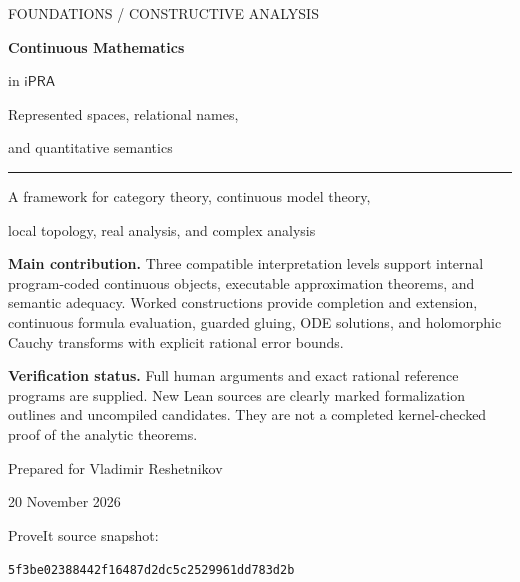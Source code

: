 \documentclass[11pt,a4paper]{article}
\newcommand{\ipra}{\ensuremath{\mathsf{iPRA}}}
\theoremstyle{definition}
\theoremstyle{remark}
\begin{document}
\begin{titlepage}
\color{ink}
\vspace*{12mm}
{\large FOUNDATIONS \; / \; CONSTRUCTIVE ANALYSIS}\par
\vspace{16mm}
{\fontsize{32}{37}\selectfont\bfseries Continuous Mathematics\par in \ipra}\par
\vspace{10mm}
{\Large Represented spaces, relational names,\par and quantitative semantics}\par
\vspace{14mm}
\rule{\linewidth}{1.2pt}\par
\vspace{7mm}
{\large A framework for category theory, continuous model theory,\par
local topology, real analysis, and complex analysis}\par
\vfill
\begin{minipage}{.94\linewidth}
\color{black}
\textbf{Main contribution.} Three compatible interpretation levels support
internal program-coded continuous objects, executable approximation theorems,
and semantic adequacy. Worked constructions provide completion and extension,
continuous formula evaluation, guarded gluing, ODE solutions, and holomorphic
Cauchy transforms with explicit rational error bounds.

\medskip
\textbf{Verification status.} Full human arguments and exact rational reference
programs are supplied. New Lean sources are clearly marked formalization
outlines and uncompiled candidates. They are not a completed kernel-checked
proof of the analytic theorems.
\end{minipage}
\vfill
{\large Prepared for Vladimir Reshetnikov}\par
20 November 2026\par
\vspace{5mm}
{\small ProveIt source snapshot:\par
\texttt{5f3be02388442f16487d2dc5c2529961dd783d2b}}\par
\end{titlepage}
\end{document}
